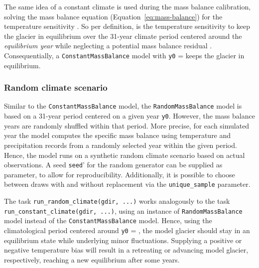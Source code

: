             The same idea of a constant climate is used during the mass balance calibration, solving the mass balance equation (Equation~\ref{eq:mass-balance}) for the temperature sensitivity \mustar. So per definition, \mustar{} is the temperature sensitivity to keep the glacier in equilibrium over the 31-year climate period centered around the \textit{equilibrium year} \tstar{} while neglecting a potential mass balance residual \bias. Consequentially, a \lstinline`ConstantMassBalance` model with \lstinline`y0` = \tstar{} keeps the glacier in equilibrium.
        

        \subsubsection{Random climate scenario} %
        \label{ssub:random_climate_scenario_implementation}

            Similar to the \lstinline`ConstantMassBalance` model, the \lstinline`RandomMassBalance` model is based on a 31-year period centered on a given year \lstinline`y0`. However, the mass balance years are randomly shuffled within that period. More precise, for each simulated year the model computes the specific mass balance using temperature and precipitation records from a randomly selected year within the given period. Hence, the model runs on a synthetic random climate scenario based on actual observations. A seed \lstinline`seed`' for the random generator can be supplied as parameter, to allow for reproducibility. Additionally, it is possible to choose between draws with and without replacement via the \lstinline`unique_sample` parameter.

            The task \lstinline`run_random_climate(gdir, ...)` works analogously to the task \lstinline`run_constant_climate(gdir, ...)`, using an instance of \lstinline`RandomMassBalance` model instead of the \lstinline`ConstantMassBalance` model. Hence, using the climatological period centered around \lstinline`y0` = \tstar, the model glacier should stay in an equilibrium state while underlying minor fluctuations. Supplying a positive or negative temperature bias will result in a retreating or advancing model glacier, respectively, reaching a new equilibrium after some years.
        
    

